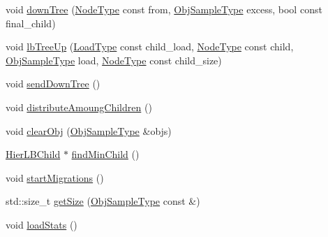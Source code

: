 \begin{DoxyCompactItemize}
\item 
void \hyperlink{structvt_1_1vrt_1_1collection_1_1lb_1_1_hierarchical_l_b_a1e7609043ea2b9830c8dd08ee0c38aa1}{down\+Tree} (\hyperlink{namespacevt_a866da9d0efc19c0a1ce79e9e492f47e2}{Node\+Type} const from, \hyperlink{structvt_1_1vrt_1_1collection_1_1lb_1_1_base_l_b_a331d7da5bbf2883238427d86b54ddd7b}{Obj\+Sample\+Type} excess, bool const final\+\_\+child)
\item 
void \hyperlink{structvt_1_1vrt_1_1collection_1_1lb_1_1_hierarchical_l_b_a6f030d878c37c7dbca04f71304319930}{lb\+Tree\+Up} (\hyperlink{structvt_1_1vrt_1_1collection_1_1lb_1_1_base_l_b_a215e22b9f12678303f49615ae3be05cc}{Load\+Type} const child\+\_\+load, \hyperlink{namespacevt_a866da9d0efc19c0a1ce79e9e492f47e2}{Node\+Type} const child, \hyperlink{structvt_1_1vrt_1_1collection_1_1lb_1_1_base_l_b_a331d7da5bbf2883238427d86b54ddd7b}{Obj\+Sample\+Type} load, \hyperlink{namespacevt_a866da9d0efc19c0a1ce79e9e492f47e2}{Node\+Type} const child\+\_\+size)
\item 
void \hyperlink{structvt_1_1vrt_1_1collection_1_1lb_1_1_hierarchical_l_b_a1b7abcf40a8dfb63e9a2ee0842af413b}{send\+Down\+Tree} ()
\item 
void \hyperlink{structvt_1_1vrt_1_1collection_1_1lb_1_1_hierarchical_l_b_a4c944c21309ab6971895acfa197e91a4}{distribute\+Amoung\+Children} ()
\item 
void \hyperlink{structvt_1_1vrt_1_1collection_1_1lb_1_1_hierarchical_l_b_a2190300d890419550a28b91e57ffacf6}{clear\+Obj} (\hyperlink{structvt_1_1vrt_1_1collection_1_1lb_1_1_base_l_b_a331d7da5bbf2883238427d86b54ddd7b}{Obj\+Sample\+Type} \&objs)
\item 
\hyperlink{structvt_1_1vrt_1_1collection_1_1lb_1_1_hier_l_b_child}{Hier\+L\+B\+Child} $\ast$ \hyperlink{structvt_1_1vrt_1_1collection_1_1lb_1_1_hierarchical_l_b_a4064a53d865ffe55ba520f0c75e9018d}{find\+Min\+Child} ()
\item 
void \hyperlink{structvt_1_1vrt_1_1collection_1_1lb_1_1_hierarchical_l_b_a0fa467216218289dba2de1c4f88b655e}{start\+Migrations} ()
\item 
std\+::size\+\_\+t \hyperlink{structvt_1_1vrt_1_1collection_1_1lb_1_1_hierarchical_l_b_ab895082b639e196f5a128785c7b9bdda}{get\+Size} (\hyperlink{structvt_1_1vrt_1_1collection_1_1lb_1_1_base_l_b_a331d7da5bbf2883238427d86b54ddd7b}{Obj\+Sample\+Type} const \&)
\item 
void \hyperlink{structvt_1_1vrt_1_1collection_1_1lb_1_1_hierarchical_l_b_a60a953c331b4a25cbe2b6f7b6d93bbb7}{load\+Stats} ()
\end{DoxyCompactItemize}
